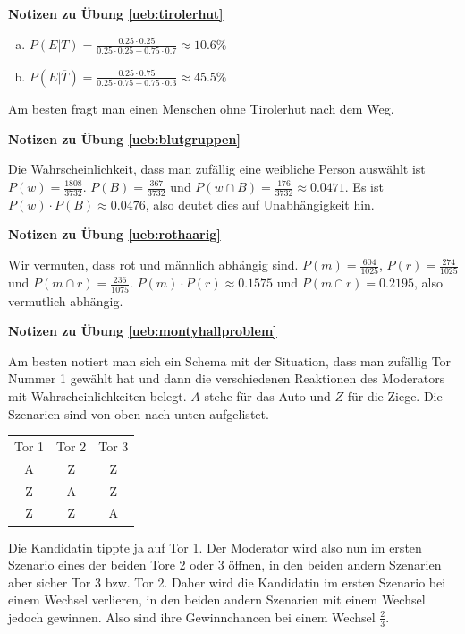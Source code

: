 \documentclass[%
<<<<<<< Updated upstream
<<<<<<< Updated upstream
11pt,%
twoside,%
titlepage,%
german,%
=======
=======
>>>>>>> Stashed changes
11pt,%
twoside,%
titlepage,%
swissgerman,%
<<<<<<< Updated upstream
>>>>>>> Stashed changes
=======
>>>>>>> Stashed changes
headsepline%
]{scrartcl}
\newcommand{\faReturnGray}{\textcolor{gray}{\faMailReply}} %
\newcommand{\spaltenheight}{\rule{0mm}{3ex}}
\newcommand{\spaltensep}{\\[1ex]}
\theoremstyle{definition}
\theoremstyle{plain}
\newcommand{\concatueb}[1]{ueb:#1}%
\newcommand{\concatlsg}[1]{lsg:#1}%
\newenvironment{lsg}[1]{%
    \par\noindent\textbf{Notizen zu Übung \ref{\concatueb{#1}}}\label{\concatlsg{#1}}
    \hfill\hyperref[\concatueb{#1}]{\faReturnGray}\par %
}{%
    \par%
}
\newcommand{\concatueb}[1]{ueb:#1}%
\newcommand{\concatlsg}[1]{lsg:#1}%
\newenvironment{lsg}[1]{%
    \par\noindent\textbf{Notizen zu Übung \ref{\concatueb{#1}}.}%
    \label{\concatlsg{#1}}
}{%
    \par%
}
\begin{document}
\begin{lsg}{tirolerhut}
    \begin{enumerate}[a)]
        \item $P(E|T)=\frac{0.25\cdot0.25}{0.25\cdot0.25+0.75\cdot0.7}\approx10.6\%$
        \item $P(E|\overline{T})=\frac{0.25\cdot0.75}{0.25\cdot0.75+0.75\cdot0.3}\approx45.5\%$
    \end{enumerate}
    Am besten fragt man einen Menschen ohne Tirolerhut nach dem Weg.
\end{lsg}
\begin{lsg}{blutgruppen}
    Die Wahrscheinlichkeit, dass man zufällig eine weibliche Person auswählt ist $P(w)=\frac{1808}{3732}$. $P(B)=\frac{367}{3732}$ und $P(w\cap B)=\frac{176}{3732}\approx0.0471$. Es ist $P(w)\cdot P(B)\approx0.0476$, also deutet dies auf Unabhängigkeit hin.
\end{lsg}
\begin{lsg}{rothaarig}
    Wir vermuten, dass rot und männlich abhängig sind. $P(m)=\frac{604}{1025}$, $P(r)=\frac{274}{1025}$ und $P(m\cap r)=\frac{236}{1075}$. $P(m)\cdot P(r)\approx0.1575$ und $P(m\cap r)=0.2195$, also vermutlich abhängig.
\end{lsg}
\begin{lsg}{montyhallproblem}
 Am besten notiert man sich ein Schema mit der Situation, dass man zufällig Tor Nummer 1 gewählt hat und dann die verschiedenen Reaktionen des Moderators mit Wahrscheinlichkeiten belegt. $A$ stehe für das Auto und $Z$ für die Ziege. Die Szenarien sind von oben nach unten aufgelistet.

\begin{table}[h!]
\begin{center}
\begin{tabular}{|c|c|c|}
\hline
\rowcolor{Gray}\spaltenheight Tor 1 & Tor 2 & Tor 3 \spaltensep \hhline{|-|-|-|}
\rowcolor{lightyellow}\spaltenheight  A & Z & Z \spaltensep \hhline{|-|-|-|}
\rowcolor{Gray}\spaltenheight Z & A & Z \spaltensep \hhline{|-|-|-|}
\rowcolor{lightyellow}\spaltenheight  Z & Z & A \spaltensep \hline
\end{tabular}
\end{center}
\end{table}
Die Kandidatin tippte ja auf Tor 1. Der Moderator wird also nun im ersten Szenario eines der beiden Tore 2 oder 3 öffnen, in den beiden andern Szenarien aber sicher Tor 3 bzw. Tor 2. Daher wird die Kandidatin im ersten Szenario bei einem Wechsel verlieren, in den beiden andern Szenarien mit einem Wechsel jedoch gewinnen. Also sind ihre Gewinnchancen bei einem Wechsel $\frac{2}{3}$.
\end{lsg}
\end{document}

